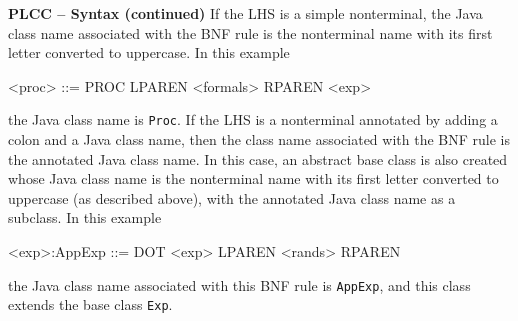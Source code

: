 \begin{minipage}[t]{\sw}
\slidenumber
\LARGE
{\bf PLCC -- Syntax (continued)}\exx
If the LHS is a simple nonterminal,
the Java class name associated with the BNF rule is the nonterminal name
with its first letter converted to uppercase.
In this example
{\Large
\begin{qv}
<proc> ::= PROC LPAREN <formals> RPAREN <exp>
\end{qv}
}
the Java class name is \verb'Proc'.\exx
If the LHS is a nonterminal annotated
by adding a colon and a Java class name,
then the class name associated with the BNF rule
is the annotated Java class name.
In this case, an abstract base class is also created
whose Java class name is the nonterminal name
with its first letter converted to uppercase (as described above),
with the annotated Java class name as a subclass.
In this example
{\Large
\begin{qv}
<exp>:AppExp ::= DOT <exp> LPAREN <rands> RPAREN
\end{qv}
}
the Java class name associated with this BNF rule is \verb'AppExp',
and this class extends the base class \verb'Exp'.
\end{minipage}
\clearpage
